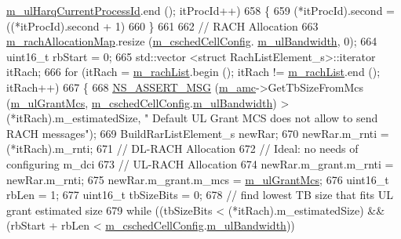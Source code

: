 \begin{DoxyCode}
      \hyperlink{classns3_1_1TdMtFfMacScheduler_a01393611d03f7107ec6c0a0db95858c2}{m\_ulHarqCurrentProcessId}.end (); itProcId++)
658     \{
659       (*itProcId).second = ((*itProcId).second + 1) %
660     \}
661 
662   \textcolor{comment}{// RACH Allocation}
663   \hyperlink{classns3_1_1TdMtFfMacScheduler_a10f3c18ee02b2d7f688c010eba536b26}{m\_rachAllocationMap}.resize (\hyperlink{classns3_1_1TdMtFfMacScheduler_a585412f686e33f49dad1003e5d2216f0}{m\_cschedCellConfig}.
      \hyperlink{structns3_1_1FfMacCschedSapProvider_1_1CschedCellConfigReqParameters_a5ab5b102878e6e7e7727a14af4a64d2f}{m\_ulBandwidth}, 0);
664   uint16\_t rbStart = 0;
665   std::vector <struct RachListElement\_s>::iterator itRach;
666   \textcolor{keywordflow}{for} (itRach = \hyperlink{classns3_1_1TdMtFfMacScheduler_a21aef93577bc95526499ff1f0b8d98cf}{m\_rachList}.begin (); itRach != \hyperlink{classns3_1_1TdMtFfMacScheduler_a21aef93577bc95526499ff1f0b8d98cf}{m\_rachList}.end (); itRach++)
667     \{
668       \hyperlink{assert_8h_aff5ece9066c74e681e74999856f08539}{NS\_ASSERT\_MSG} (\hyperlink{classns3_1_1TdMtFfMacScheduler_a2fa1c7abd867e10a52fcd0de82dc6cc1}{m\_amc}->GetTbSizeFromMcs (\hyperlink{classns3_1_1TdMtFfMacScheduler_a2ddc0da4bf65cdd492c7a956580dca6f}{m\_ulGrantMcs}, 
      \hyperlink{classns3_1_1TdMtFfMacScheduler_a585412f686e33f49dad1003e5d2216f0}{m\_cschedCellConfig}.\hyperlink{structns3_1_1FfMacCschedSapProvider_1_1CschedCellConfigReqParameters_a5ab5b102878e6e7e7727a14af4a64d2f}{m\_ulBandwidth}) > (*itRach).m\_estimatedSize, \textcolor{stringliteral}{" Default UL
       Grant MCS does not allow to send RACH messages"});
669       BuildRarListElement\_s newRar;
670       newRar.m\_rnti = (*itRach).m\_rnti;
671       \textcolor{comment}{// DL-RACH Allocation}
672       \textcolor{comment}{// Ideal: no needs of configuring m\_dci}
673       \textcolor{comment}{// UL-RACH Allocation}
674       newRar.m\_grant.m\_rnti = newRar.m\_rnti;
675       newRar.m\_grant.m\_mcs = \hyperlink{classns3_1_1TdMtFfMacScheduler_a2ddc0da4bf65cdd492c7a956580dca6f}{m\_ulGrantMcs};
676       uint16\_t rbLen = 1;
677       uint16\_t tbSizeBits = 0;
678       \textcolor{comment}{// find lowest TB size that fits UL grant estimated size}
679       \textcolor{keywordflow}{while} ((tbSizeBits < (*itRach).m\_estimatedSize) && (rbStart + rbLen < 
      \hyperlink{classns3_1_1TdMtFfMacScheduler_a585412f686e33f49dad1003e5d2216f0}{m\_cschedCellConfig}.\hyperlink{structns3_1_1FfMacCschedSapProvider_1_1CschedCellConfigReqParameters_a5ab5b102878e6e7e7727a14af4a64d2f}{m\_ulBandwidth}))

\end{DoxyCode}
